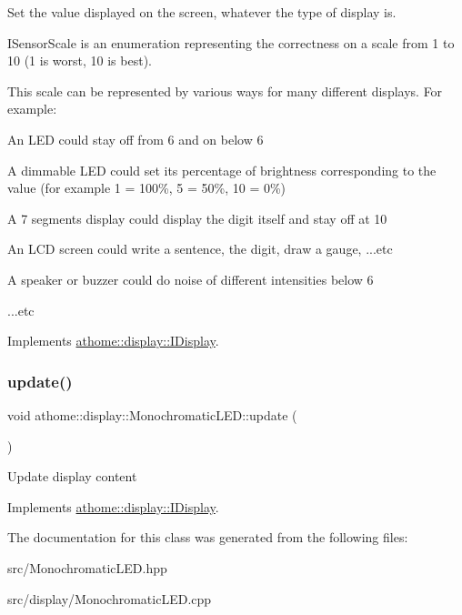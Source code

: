 Set the value displayed on the screen, whatever the type of display is.

I\+Sensor\+Scale is an enumeration representing the correctness on a scale from 1 to 10 (1 is worst, 10 is best).

This scale can be represented by various ways for many different displays. For example\+:


\begin{DoxyItemize}
\item An L\+ED could stay off from 6 and on below 6
\item A dimmable L\+ED could set it\textquotesingle{}s percentage of brightness corresponding to the value (for example 1 = 100\%, 5 = 50\%, 10 = 0\%)
\item A 7 segments display could display the digit itself and stay off at 10
\item An L\+CD screen could write a sentence, the digit, draw a gauge, ...etc
\item A speaker or buzzer could do noise of different intensities below 6
\item ...etc 
\end{DoxyItemize}

Implements \mbox{\hyperlink{classathome_1_1display_1_1_i_display_a3c9678f929e4bc04742d458b0c2399ef}{athome\+::display\+::\+I\+Display}}.

\mbox{\label{classathome_1_1display_1_1_monochromatic_l_e_d_aef6a651fdbb24ebb1d0887c1b3e5133d}} 
\subsubsection{\texorpdfstring{update()}{update()}}
{\footnotesize\ttfamily void athome\+::display\+::\+Monochromatic\+L\+E\+D\+::update (\begin{DoxyParamCaption}{ }\end{DoxyParamCaption})\hspace{0.3cm}{\ttfamily [virtual]}}

Update display content 

Implements \mbox{\hyperlink{classathome_1_1display_1_1_i_display_a4ba7bd5d46f88578f1c846f4f5f3c5d1}{athome\+::display\+::\+I\+Display}}.



The documentation for this class was generated from the following files\+:\begin{DoxyCompactItemize}
\item 
src/Monochromatic\+L\+E\+D.\+hpp\item 
src/display/Monochromatic\+L\+E\+D.\+cpp\end{DoxyCompactItemize}
